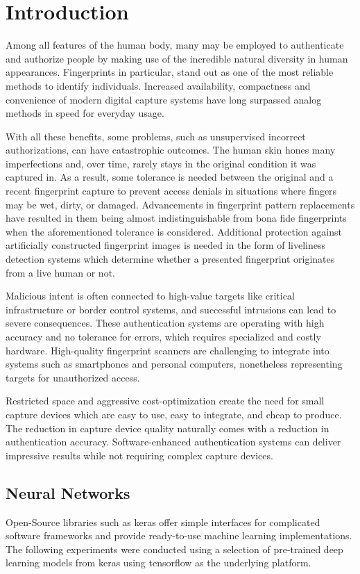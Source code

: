 \section{Introduction}
Among all features of the human body, many may be employed to authenticate and authorize people by making use of the incredible natural diversity in human appearances. 
Fingerprints in particular, stand out as one of the most reliable methods to identify individuals.
Increased availability, compactness and convenience of modern digital capture systems have long surpassed analog methods in speed for everyday usage.

With all these benefits, some problems, such as unsupervised incorrect authorizations, can have catastrophic outcomes.
The human skin hones many imperfections and, over time, rarely stays in the original condition it was captured in.
As a result, some tolerance is needed between the original and a recent fingerprint capture to prevent access denials in situations where fingers may be wet, dirty, or damaged.
Advancements in fingerprint pattern replacements have resulted in them being almost indistinguishable from bona fide fingerprints when the aforementioned tolerance is considered.
Additional protection against artificially constructed fingerprint images is needed in the form of liveliness detection systems which determine whether a presented fingerprint originates from a live human or not.

Malicious intent is often connected to high-value targets like critical infrastructure or border control systems, and successful intrusions can lead to severe consequences.
These authentication systems are operating with high accuracy and no tolerance for errors, which requires specialized and costly hardware.
High-quality fingerprint scanners are challenging to integrate into systems such as smartphones and personal computers, nonetheless representing targets for unauthorized access.

Restricted space and aggressive cost-optimization create the need for small capture devices which are easy to use, easy to integrate, and cheap to produce. 
The reduction in capture device quality naturally comes with a reduction in authentication accuracy.
Software-enhanced authentication systems can deliver impressive results while not requiring complex capture devices.



\subsection{Neural Networks}
Open-Source libraries such as \gls{keras} offer simple interfaces for complicated software frameworks and provide ready-to-use machine learning implementations.
The following experiments were conducted using a selection of pre-trained deep learning models from \gls{keras} using \gls{tensorflow} as the underlying platform.

